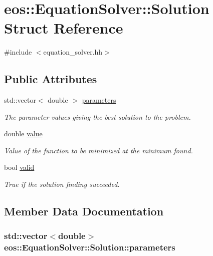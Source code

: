 \hypertarget{structeos_1_1EquationSolver_1_1Solution}{
\section{eos::EquationSolver::Solution Struct Reference}
\label{structeos_1_1EquationSolver_1_1Solution}
}


{\ttfamily \#include $<$equation\_\-solver.hh$>$}\subsection*{Public Attributes}
\begin{DoxyCompactItemize}
\item 
std::vector$<$ double $>$ \hyperlink{structeos_1_1EquationSolver_1_1Solution_ac0f9639b6d1b2cd2ca250a1dd4cb0549}{parameters}
\begin{DoxyCompactList}\small\item\em The parameter values giving the best solution to the problem. \item\end{DoxyCompactList}\item 
double \hyperlink{structeos_1_1EquationSolver_1_1Solution_acb4de717f8f570cc92d3f1f2f7c6b085}{value}
\begin{DoxyCompactList}\small\item\em Value of the function to be minimized at the minimum found. \item\end{DoxyCompactList}\item 
bool \hyperlink{structeos_1_1EquationSolver_1_1Solution_a13f38764efb070fcb3af4fca3db02d1e}{valid}
\begin{DoxyCompactList}\small\item\em True if the solution finding succeeded. \item\end{DoxyCompactList}\end{DoxyCompactItemize}


\subsection{Member Data Documentation}
\hypertarget{structeos_1_1EquationSolver_1_1Solution_ac0f9639b6d1b2cd2ca250a1dd4cb0549}{
\subsubsection[{parameters}]{\setlength{\rightskip}{0pt plus 5cm}std::vector$<$double$>$ {\bf eos::EquationSolver::Solution::parameters}}}
\label{structeos_1_1EquationSolver_1_1Solution_ac0f9639b6d1b2cd2ca250a1dd4cb0549}


